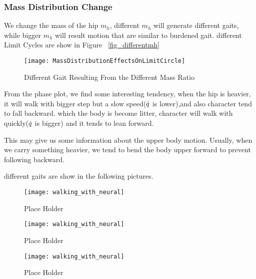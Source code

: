 \subsubsection*{Mass Distribution Change}
We change the mass of the hip $m_h$, different $m_h$ will generate different gaits, while bigger $m_h$ will result motion that are similar to burdened gait.
different Limit Cycles are show in Figure ~\ref{fig_differentmh}
\begin{figure}[!htbp]
  \begin{center}
      \texttt{[image: MassDistributionEffectsOnLimitCircle]}
    \caption{Different Gait Resulting From the Different Mass Ratio}
    \label{fig:differentmh}
\end{center}
\end{figure}

From the phase plot, we find some interesting tendency,
when the hip is heavier, it will walk with bigger step but a slow speed($\dot{q}$ is lower),and also character tend to fall backward.
which the body is become litter, character will walk with quickly($\dot{q}$ is bigger) and it tends to lean forward.

This may give us some information about the upper body motion.
Usually, when we carry something heavier, we  tend to bend the body upper forward to prevent following backward.

different gaits are show in the following pictures.
\begin{figure}[!htbp]
  \begin{center}
      \texttt{[image: walking\_with\_neural]}
    \caption{Place Holder}
    \label{fig:massh1}
\end{center}
\end{figure}

\begin{figure}[!htbp]
  \begin{center}
      \texttt{[image: walking\_with\_neural]}
    \caption{Place Holder}
    \label{fig:massh2}
\end{center}
\end{figure}

\begin{figure}[!htbp]
  \begin{center}
      \texttt{[image: walking\_with\_neural]}
    \caption{Place Holder}
    \label{fig:massh3}
\end{center}
\end{figure}

